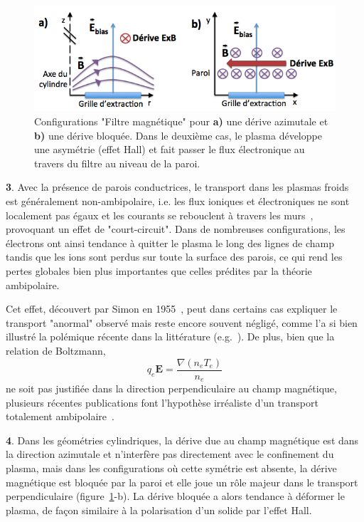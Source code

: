 \begin{refsection}
\begin{figure}[htbp]
\centering
\includegraphics[width=\textwidth]{figures/derives.png}
{\caption{Configurations "Filtre magnétique" pour
\textbf{a)} une dérive azimutale et \textbf{b)} une dérive
bloquée. Dans le deuxième cas, le plasma développe une
asymétrie (effet Hall) et fait passer le flux
électronique au travers du filtre au niveau de la
paroi.}\label{Contextederive}}
\end{figure}

\textbf{3}. Avec la présence de parois conductrices, le transport dans les
plasmas froids est généralement non-ambipolaire, i.e. les flux ioniques et
électroniques ne sont localement pas égaux et les courants se rebouclent à
travers les murs~\parencite{Rozhansky}, provoquant un effet de "court-circuit".
Dans de nombreuses configurations, les électrons ont ainsi tendance à quitter
le plasma le long des lignes de champ tandis que les ions sont perdus sur toute
la surface des parois, ce qui rend les pertes globales bien plus importantes
que celles prédites par la théorie ambipolaire.

Cet effet, découvert par Simon en 1955~\parencite{Simon55}, peut dans certains
cas expliquer le transport "anormal" observé mais reste encore souvent négligé,
comme l'a si bien illustré la polémique récente dans la littérature
(e.g.~\parencite{Fruchtman,Simon08,Fruchtman08}). De plus, bien que la relation
de Boltzmann,
\begin{equation}
q_e\mathbf
E =\frac{\nabla (n_e T_e)}{n_e}
\end{equation}
ne soit pas justifiée dans la direction perpendiculaire au champ magnétique,
plusieurs récentes publications font l'hypothèse irréaliste d'un transport
totalement ambipolaire~\parencite{Fruchtman,Nasi}.
\vspace{1cm}

\textbf{4}. Dans les géométries cylindriques, la dérive due au champ magnétique
est dans la direction azimutale et n'interfère pas directement avec le
confinement du plasma, mais dans les
configurations où cette symétrie est absente, la dérive magnétique est bloquée
par la paroi et elle joue un rôle majeur dans le transport perpendiculaire
(figure~\ref{Contextederive}-b). La dérive bloquée a alors tendance à déformer
le plasma, de façon similaire à la polarisation d'un solide par l'effet Hall.


\end{refsection}
